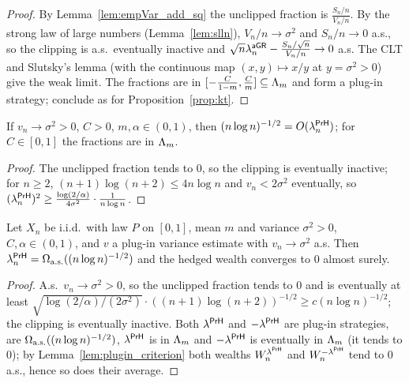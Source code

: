 \begin{proof}
  \leanok
  By Lemma~\ref{lem:empVar_add_sq} the unclipped fraction is $\frac{S_n/n}{V_n/n}$. By the strong
  law of large numbers (Lemma~\ref{lem:slln}), $V_n/n \to \sigma^2$ and $S_n/n \to 0$ a.s., so the
  clipping is a.s.\ eventually inactive and $\sqrt n \lambda^{\mathsf{aGR}}_n - \frac{S_n/\sqrt n}{V_n/n} \to 0$
  a.s. The CLT and Slutsky's lemma (with the continuous map $(x, y) \mapsto x/y$ at $y = \sigma^2 >
  0$) give the weak limit. The fractions are in $[-\frac{C}{1-m}, \frac Cm] \subseteq \Lambda_m$ and form
  a plug-in strategy; conclude as for Proposition~\ref{prop:kt}.
\end{proof}

\begin{lemma}
  \label{lem:hedge_rate}
  \leanok
  If $v_n \to \sigma^2 > 0$, $C > 0$, $m, \alpha \in (0,1)$, then $(n \log n)^{-1/2} =
  O(\lambda^{\mathsf{PrH}}_n)$; for $C \in [0,1]$ the fractions are in $\Lambda_m$.
\end{lemma}

\begin{proof}
  \leanok
  The unclipped fraction tends to $0$, so the clipping is eventually inactive; for $n \ge 2$,
  $(n+1)\log(n+2) \le 4 n \log n$ and $v_n < 2\sigma^2$ eventually, so
  $(\lambda^{\mathsf{PrH}}_n)^2 \ge \frac{\log(2/\alpha)}{4\sigma^2} \cdot \frac{1}{n \log n}$.
\end{proof}

\begin{proposition}
  \label{prop:hedge}
  \leanok
  Let $X_n$ be i.i.d.\ with law $P$ on $[0,1]$, mean $m$ and variance $\sigma^2 > 0$, $C, \alpha \in
  (0,1)$, and $v$ a plug-in variance estimate with $v_n \to \sigma^2$ a.s. Then $\lambda^{\mathsf{PrH}}_n =
  \Omega_{\mathrm{a.s.}}((n\log n)^{-1/2})$ and the hedged wealth converges to $0$ almost surely.
\end{proposition}

\begin{proof}
  \leanok
  A.s.\ $v_n \to \sigma^2 > 0$, so the unclipped fraction tends to $0$ and is eventually at least
  $\sqrt{\log(2/\alpha)/(2\sigma^2)} \cdot ((n+1)\log(n+2))^{-1/2} \ge c (n \log n)^{-1/2}$; the
  clipping is eventually inactive. Both $\lambda^{\mathsf{PrH}}$ and $-\lambda^{\mathsf{PrH}}$ are plug-in strategies, are
  $\Omega_{\mathrm{a.s.}}((n \log n)^{-1/2})$, $\lambda^{\mathsf{PrH}}$ is in $\Lambda_m$ and $-\lambda^{\mathsf{PrH}}$ is eventually in $\Lambda_m$ (it tends to
  $0$); by Lemma~\ref{lem:plugin_criterion} both wealths $W^{\lambda^{\mathsf{PrH}}}_n$ and $W^{-\lambda^{\mathsf{PrH}}}_n$ tend to $0$
  a.s., hence so does their average.
\end{proof}

